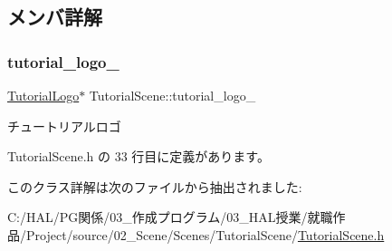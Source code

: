 \subsection{メンバ詳解}
\mbox{\label{class_tutorial_scene_a3c2e0e47c2e6078bb7eff928d72fde2a}} 
\subsubsection{\texorpdfstring{tutorial\+\_\+logo\+\_\+}{tutorial\_logo\_}}
{\footnotesize\ttfamily \mbox{\hyperlink{class_tutorial_logo}{Tutorial\+Logo}}$\ast$ Tutorial\+Scene\+::tutorial\+\_\+logo\+\_\+\hspace{0.3cm}{\ttfamily [private]}}



チュートリアルロゴ 



 Tutorial\+Scene.\+h の 33 行目に定義があります。



このクラス詳解は次のファイルから抽出されました\+:\begin{DoxyCompactItemize}
\item 
C\+:/\+H\+A\+L/\+P\+G関係/03\+\_\+作成プログラム/03\+\_\+\+H\+A\+L授業/就職作品/\+Project/source/02\+\_\+\+Scene/\+Scenes/\+Tutorial\+Scene/\mbox{\hyperlink{_tutorial_scene_8h}{Tutorial\+Scene.\+h}}\end{DoxyCompactItemize}
